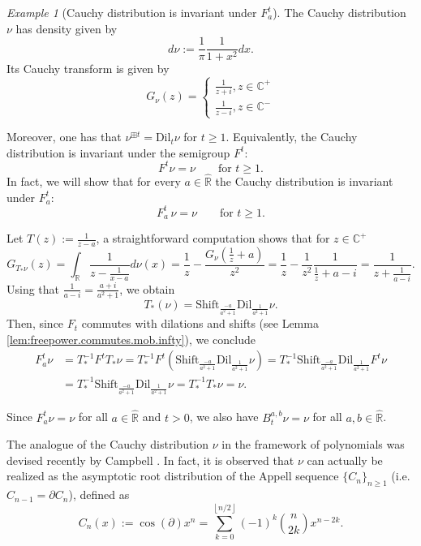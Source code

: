 \documentclass[reqno,11pt]{amsart}
\theoremstyle{remark}
\newtheorem{example}[theorem]{Example}
\newcommand{\cc}{\mathbb{C}}
\newcommand{\rr}{\mathbb{R}}
\newcommand{\dil}[1]{\mbox{Dil}_{#1}}
\newcommand{\shift}[1]{\mbox{Shift}_{#1}}
\newcommand{\freepower}[1]{F^{#1}}
\newcommand{\pfreepower}[2]{F_{#1}^{#2}}
\begin{document}
\begin{example}[Cauchy distribution is invariant under $ \pfreepower{a}{t} $]
The Cauchy distribution $\nu$ has density given by $$ d\nu := \frac{1}{\pi}\frac{1}{1+x^2}dx.$$ Its Cauchy transform is given by $$G_{\nu}(z) = \begin{cases}
    \frac{1}{z+i},z\in \cc^+\\
    \frac{1}{z-i},z\in \cc^-
\end{cases}$$

Moreover, one has that $ \nu^{\boxplus t} = \dil{t}\nu$ for $t\geq 1$. Equivalently, the Cauchy distribution is invariant under the semigroup  $\freepower{t}$:
$$ \freepower{t}\nu= \nu \qquad \text{for } t\geq 1. $$ 
In fact, we will show that for every $a\in \hat{\rr}$ the Cauchy distribution is invariant under $\pfreepower{a}{t}$:
$$ \pfreepower{a}{t}\, \nu = \nu \qquad \text{for } t\geq 1. $$ 

Let $ T(z) := \frac{1}{z-a} $, a straightforward computation shows that for $ z\in \cc^+ $
$$ G_{T_* \nu}(z) = \int_\rr\frac{1}{z-\frac{1}{x-a}}d\nu(x)=  \frac{1}{z}-\frac{G_{\nu}\left( \frac{1}{z}+a\right)}{z^2}=\frac{1}{z}- \frac{1}{z^2}\frac{1}{\frac{1}{z}+a  - i} 
= \frac{1}{z+\frac{1}{a-i}}.$$
Using that $ \frac{1}{a-i} = \frac{a+i}{a^2+1} $, we obtain
$$ T_*(\nu) = \shift{\frac{-a}{a^2+1}} \dil{\frac{1}{a^2+1}}\nu .$$
Then, since $F_t$ commutes with dilations and shifts (see Lemma \ref{lem:freepower.commutes.mob.infty}), we conclude
\begin{align*}
    \pfreepower{a}{t}\nu &= T_*^{-1}\freepower{t}T_*\nu = T_*^{-1}\freepower{t} \left(  \shift{\frac{-a}{a^2+1}} \dil{\frac{1}{a^2+1}}\nu \right)=T_*^{-1}  \shift{\frac{-a}{a^2+1}} \dil{\frac{1}{a^2+1}}\freepower{t}\nu \\
    &= T_*^{-1}  \shift{\frac{-a}{a^2+1}} \dil{\frac{1}{a^2+1}}\nu=T_*^{-1}T_*\nu = \nu.
\end{align*}

Since $ \pfreepower{a}{t}\nu = \nu $ for all $a\in \hat{\rr}$ and $t>0$, we also have $ B_{t}^{a,b}\nu = \nu $ for all $a,b\in \hat{\rr}$.

The analogue of the Cauchy distribution $\nu$ in the framework of polynomials was devised recently by Campbell \cite[Theorem 2.4]{campbell2024free}. In fact, it is observed that $\nu$ can actually be realized as the asymptotic root distribution of the Appell sequence $ \{C_n\}_{n\geq 1} $ (i.e. $ C_{n-1}=\partial C_n $), defined as
$$ C_n(x) := \cos(\partial)x^n =\sum_{k=0}^{\left\lfloor n/2 \right\rfloor} (-1)^k \binom{n}{2k} x^{n-2k}. $$


\end{example}
\end{document}
